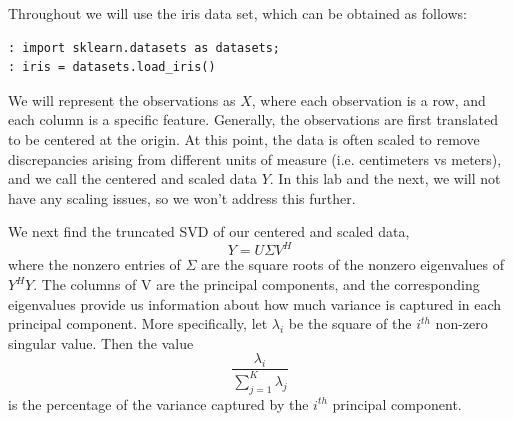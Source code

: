 Throughout we will use the iris data set, which can be obtained as follows:
\begin{lstlisting}
: import sklearn.datasets as datasets;
: iris = datasets.load_iris()
\end{lstlisting}
We will represent the observations as $X$, where each observation is a row, and each column is a specific feature. Generally, the observations are first translated to be centered at the origin. At this point, the data is often scaled to remove discrepancies arising from different units of measure (i.e. centimeters vs meters), and we call the centered and scaled data $Y$. In this lab and the next, we will not have any scaling issues, so we won't address this further. 

We next find the truncated SVD of our centered and scaled data, $$Y = U\Sigma V^{H}$$ where the nonzero entries of $\Sigma$ are the square roots of the nonzero eigenvalues of $Y^{H}Y$. The columns of V are the principal components, and the corresponding eigenvalues provide us information about how much variance is captured in each principal component. More specifically, let $\lambda_{i}$ be the square of the $i^{th}$ non-zero singular value. Then the value $$\frac{\lambda_{i}}{\sum_{j=1}^{K} \lambda_{j}}$$ is the percentage of the variance captured by the $i^{th}$ principal component.

